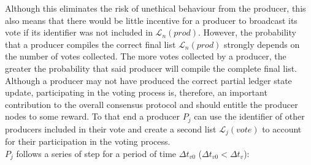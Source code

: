 \documentclass{article}
\begin{document}
Although this eliminates the risk of unethical behaviour from the producer, this also means that there would be little incentive for a producer to broadcast its vote if its identifier was not included in $\mathcal{L}_n(prod)$. However, the probability that a producer compiles the correct final list $\mathcal{L}_n(prod)$ strongly depends on the number of votes collected. The more votes collected by a producer, the greater the probability that said producer will compile the complete final list. Although a producer may not have produced the correct partial ledger state update, participating in the voting process is, therefore, an important contribution to the overall consensus protocol and should entitle the producer nodes to some reward. To that end a producer $P_j$ can use the identifier of other producers included in their vote and create a second list $\mathcal{L}_j(vote)$ to account for their participation in the voting process. \\
 
$P_j$ follows a series of step for a period of time $\Delta t_{v0}$ ($\Delta t_{v0} < \Delta t_{v}$):
\end{document}

